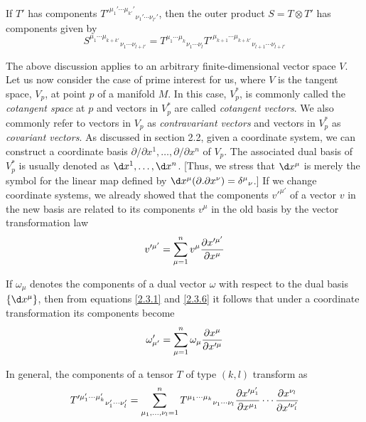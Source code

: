 If $T'$ has components ${T'^{\mu_1'\cdots\mu_{k'}'}}_{\nu_1'\cdots\nu_{l'}'}$, then the outer product $S=T\otimes T'$ has components given by
\begin{equation}
    {S^{\mu_1\cdots\mu_{k+k'}}}_{\nu_1\cdots\nu_{l+l'}}={T^{\mu_1\cdots\mu_k}}_{\nu_1\cdots\nu_l}{T'^{\mu_{k+1}\cdots\mu_{k+k'}}}_{\nu_{l+1}\cdots\nu_{l+l'}}
    \label{2.3.5}
\end{equation}

The above discussion applies to an arbitrary finite-dimensional vector space $V$. Let us now consider the case of prime interest for us, where $V$ is the tangent space, $V_p$, at point $p$ of a manifold $M$. In this case, $V_p^*$, is commonly called the \emph{cotangent space} at $p$ and vectors in $V_p^*$ are called \emph{cotangent vectors}. We also commonly refer to vectors in $V_p$ as \emph{contravariant vectors} and vectors in $V_p^*$ as \emph{covariant vectors}. As discussed in section 2.2, given a coordinate system, we can construct a coordinate basis $\partial/\partial x^1,\ldots,\partial/\partial x^n$ of $V_p$. The associated dual basis of $V_p^*$ is usually denoted as $\d x^1,\ldots,\d x^n$. [Thus, we stress that $\d x^\mu$ is merely the symbol for the linear map defined by $\d x^\mu(\partial.\partial x^\nu)={\delta^\mu}_\nu$.] If we change coordinate systems, we already showed that the components $v'^{\mu'}$ of a vector $v$ in the new basis are related to its components $v^\mu$ in the old basis by the vector transformation law
\begin{equation}
    v'^{\mu'}=\sum_{\mu=1}^nv^\mu\pdv{x'^{\mu'}}{x^\mu}
    \label{2.3.6}
\end{equation}

If $\omega_\mu$ denotes the components of a dual vector $\omega$ with respect to the dual basis $\{\d x^\mu\}$, then from equations \eqref{2.3.1} and \eqref{2.3.6} it follows that under a coordinate transformation its components become
\begin{equation}
    \omega_{\mu'}'=\sum_{\mu=1}^n\omega_\mu\pdv{x^\mu}{x'^\mu}
    \label{2.3.7}
\end{equation}

In general, the components of a tensor $T$ of type $(k, l)$ transform as
\begin{equation}
    {T'^{\mu_1'\cdots\mu_k'}}_{\nu_1'\cdots\nu_l'}=\sum_{\mu_1,\ldots,\nu_l=1}^n{T^{\mu_1\cdots\mu_k}}_{\nu_1\cdots\nu_l}\pdv{x'^{\mu_1'}}{x^{\mu_1}}\cdots\pdv{x^{\nu_l}}{x'^{\nu_l'}}
    \label{2.3.8}
\end{equation}


